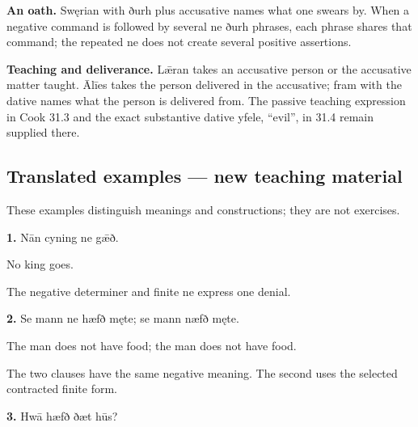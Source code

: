 \textbf{An oath.} Swęrian with ðurh plus accusative names what one swears by. When a negative command is followed by several ne ðurh phrases, each phrase shares that command; the repeated ne does not create several positive assertions.

\textbf{Teaching and deliverance.} Lǣran takes an accusative person or the accusative matter taught. Ālīes takes the person delivered in the accusative; fram with the dative names what the person is delivered from. The passive teaching expression in Cook 31.3 and the exact substantive dative yfele, “evil”, in 31.4 remain supplied there.

\subsection*{Translated examples — new teaching material}

These examples distinguish meanings and constructions; they are not exercises.

\textbf{1.} Nān cyning ne gǣð.

No king goes.

The negative determiner and finite ne express one denial.

\textbf{2.} Se mann ne hæfð męte; se mann næfð męte.

The man does not have food; the man does not have food.

The two clauses have the same negative meaning. The second uses the selected contracted finite form.

\textbf{3.} Hwā hæfð ðæt hūs?

